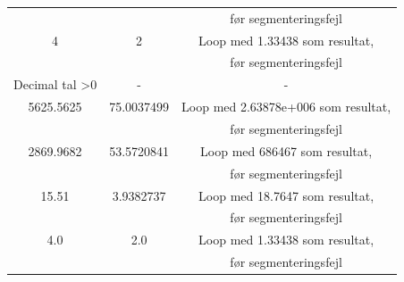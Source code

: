 \documentclass[11pt]{article}
\begin{document}
\begin{center}
\begin{tabular}{ |c|c|c| }
              && før segmenteringsfejl \\
              4 & 2 & Loop med 1.33438 som resultat,\\ 
              && før segmenteringsfejl \\
             Decimal tal \textgreater 0 & - & - \\
              5625.5625 & 75.0037499 & Loop med 2.63878e+006 som resultat,\\ 
              && før segmenteringsfejl \\
              2869.9682 & 53.5720841 & Loop med 686467 som resultat,\\ 
              && før segmenteringsfejl \\
              15.51 & 3.9382737 & Loop med 18.7647 som resultat,\\ 
              && før segmenteringsfejl \\
              4.0 & 2.0 & Loop med 1.33438 som resultat,\\ 
              && før segmenteringsfejl \\
             \hline
        \end{tabular}
    \end{center}
    
    \newpage 
\end{document}
